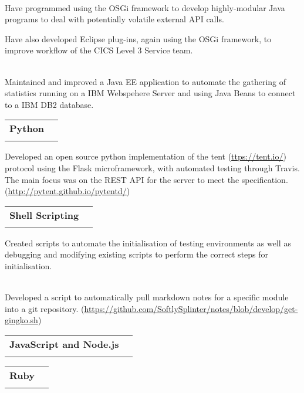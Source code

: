 \documentclass[letterpaper,11pt]{article}
\makeatletter
\newcommand{\ressubheading}[4]{
\begin{tabular*}{6.5in}{l@{\cftdotfill{\cftsecdotsep}\extracolsep{\fill}}r}
		\textbf{#1} & #2 \\
		\textit{#3} & \textit{#4} \\
\end{tabular*}\vspace{-6pt}}
\makeatother
\begin{document}
\hfill \\

Have programmed using the OSGi framework to develop highly-modular Java programs
to deal with potentially volatile external API calls.

Have also developed Eclipse plug-ins, again using the OSGi framework, to improve
workflow of the CICS Level 3 Service team.

\hfill \\

Maintained and improved a Java EE application to automate the gathering of 
statistics running on a IBM Webspehere Server and using Java Beans to connect to
a IBM DB2 database.



\vspace{10pt}
\ressubheading{Python}{}{}{}


Developed an open source python implementation of the tent (\url{ttps://tent.io/}) 
protocol using the Flask microframework, with automated testing through Travis.
The main focus was on the REST API for the server to meet the specification.
(\url{http://pytent.github.io/pytentd/})


\vspace{10pt}
\ressubheading{Shell Scripting}{}{}{}



Created scripts to automate the initialisation of testing environments as well
as debugging and modifying existing scripts to perform the correct steps for
initialisation.

\hfill \\

Developed a script to automatically pull markdown notes for a specific module
into a git repository. (\url{https://github.com/SoftlySplinter/notes/blob/develop/get-gingko.sh})

\vspace{10pt}
\ressubheading{JavaScript and Node.js}{}{}{}



\vspace{10pt}
\ressubheading{Ruby}{}{}{}

\end{document}
